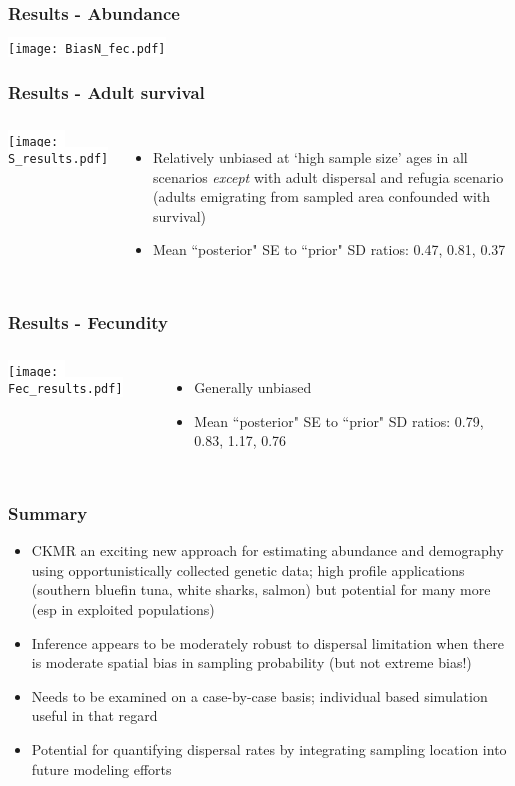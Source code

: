 \documentclass[serif,mathserif]{beamer}
\begin{document}
\begin{frame}
\frametitle{Results - Abundance}
  \colorbox{white}{\texttt{[image: BiasN\_fec.pdf]}}
\end{frame}

\begin{frame}
\frametitle{Results - Adult survival}
  \begin{columns}[c]
  \column{2.5in}
  \colorbox{white}{\texttt{[image: S\_results.pdf]}}
  \column{1.5in}
   \begin{itemize}
   \item Relatively unbiased at `high sample size' ages in all scenarios \textit{except} with adult dispersal and refugia scenario (adults emigrating from sampled area confounded with survival)
   \item Mean ``posterior" SE to ``prior" SD ratios: 0.47, 0.81, 0.37
   \end{itemize}
  \end{columns}
\end{frame}

\begin{frame}
\frametitle{Results - Fecundity}
  \begin{columns}[c]
  \column{2.5in}
  \colorbox{white}{\texttt{[image: Fec\_results.pdf]}}
       \column{1.5in}
    \begin{itemize}
   \item Generally unbiased
   \item Mean ``posterior" SE to ``prior" SD ratios: 0.79, 0.83, 1.17, 0.76
   \end{itemize}
   \end{columns}
\end{frame}

\begin{frame}
\frametitle{Summary}
 \begin{itemize}
   \item CKMR an exciting new approach for estimating abundance and demography using opportunistically collected genetic data; high profile applications (southern bluefin tuna, white sharks, salmon) but potential for many more (esp in exploited populations) \pause
   \item Inference appears to be moderately robust to dispersal limitation when there is moderate spatial bias in sampling probability (but not extreme bias!)  \pause
    \item Needs to be examined on a case-by-case basis; individual based simulation useful in that regard \pause
   \item Potential for quantifying dispersal rates by integrating sampling location into future modeling efforts
  \end{itemize}
\end{frame}
\end{document}
